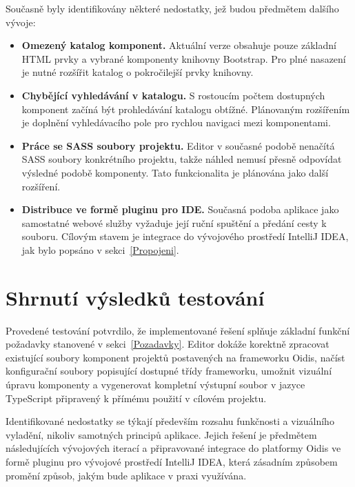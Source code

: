 Současně byly identifikovány některé nedostatky, jež budou předmětem 
dalšího vývoje:

\begin{itemize}
    \item \textbf{Omezený katalog komponent.} Aktuální verze obsahuje pouze základní HTML prvky a vybrané komponenty knihovny Bootstrap. Pro plné nasazení je nutné rozšířit katalog o pokročilejší prvky knihovny.
    
    \item \textbf{Chybějící vyhledávání v katalogu.} S rostoucím počtem dostupných komponent začíná být prohledávání katalogu obtížné. Plánovaným rozšířením je doplnění vyhledávacího pole pro rychlou navigaci mezi komponentami.
    
    \item \textbf{Práce se SASS soubory projektu.} Editor v současné podobě nenačítá SASS soubory konkrétního projektu, takže náhled nemusí přesně odpovídat výsledné podobě komponenty. Tato funkcionalita je plánována jako další rozšíření.
    
    \item \textbf{Distribuce ve formě pluginu pro IDE.} Současná podoba aplikace jako samostatné webové služby vyžaduje její ruční spuštění a předání cesty k souboru. Cílovým stavem je integrace do vývojového prostředí IntelliJ IDEA, jak bylo popsáno v sekci~\ref{Propojeni}.
\end{itemize}

\section{Shrnutí výsledků testování}

Provedené testování potvrdilo, že implementované řešení splňuje základní funkční požadavky stanovené v sekci~\ref{Pozadavky}. Editor dokáže korektně zpracovat existující soubory komponent projektů postavených na frameworku Oidis, načíst konfigurační soubory popisující dostupné třídy frameworku, umožnit vizuální 
úpravu komponenty a vygenerovat kompletní výstupní soubor v jazyce TypeScript připravený k přímému použití v cílovém projektu.

Identifikované nedostatky se týkají především rozsahu funkčnosti a vizuálního vyladění, nikoliv samotných principů aplikace. Jejich řešení je předmětem následujících vývojových iterací a připravované integrace do platformy Oidis ve formě pluginu pro vývojové prostředí IntelliJ IDEA, která zásadním způsobem promění způsob, jakým bude aplikace v praxi využívána.

